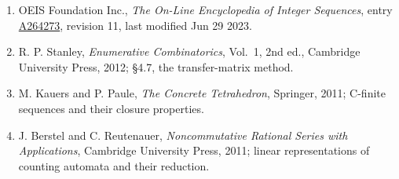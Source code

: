 \documentclass[11pt]{article}
\theoremstyle{definition}
\begin{document}
\begin{enumerate}

\item OEIS Foundation Inc., \emph{The On-Line Encyclopedia of Integer Sequences}, entry \href{https://oeis.org/A264273}{A264273}, revision 11, last modified Jun 29 2023.

\item R. P. Stanley, \emph{Enumerative Combinatorics}, Vol.~1, 2nd ed., Cambridge University Press, 2012; \S4.7, the transfer-matrix method.

\item M. Kauers and P. Paule, \emph{The Concrete Tetrahedron}, Springer, 2011; C-finite sequences and their closure properties.

\item J. Berstel and C. Reutenauer, \emph{Noncommutative Rational Series with Applications}, Cambridge University Press, 2011; linear representations of counting automata and their reduction.

\end{enumerate}
\end{document}
